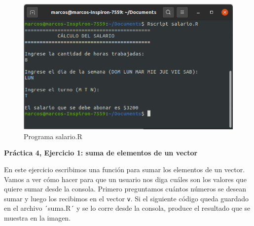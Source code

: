 \documentclass[
]{book}
\newenvironment{Shaded}{\begin{snugshade}}{\end{snugshade}}
\newcommand{\AttributeTok}[1]{\textcolor[rgb]{0.77,0.63,0.00}{#1}}
\newcommand{\ControlFlowTok}[1]{\textcolor[rgb]{0.13,0.29,0.53}{\textbf{#1}}}
\newcommand{\DecValTok}[1]{\textcolor[rgb]{0.00,0.00,0.81}{#1}}
\newcommand{\FunctionTok}[1]{\textcolor[rgb]{0.00,0.00,0.00}{#1}}
\newcommand{\NormalTok}[1]{#1}
\newcommand{\OtherTok}[1]{\textcolor[rgb]{0.56,0.35,0.01}{#1}}
\newcommand{\SpecialCharTok}[1]{\textcolor[rgb]{0.00,0.00,0.00}{#1}}
\newcommand{\StringTok}[1]{\textcolor[rgb]{0.31,0.60,0.02}{#1}}
\begin{document}
\begin{Shaded}
\end{Shaded}

\begin{figure}

{\centering \includegraphics[width=0.8\linewidth]{images/07_otros/consola3} 

}

\caption{Programa salario.R}\label{fig:unnamed-chunk-201}
\end{figure}

\textbf{Práctica 4, Ejercicio 1: suma de elementos de un vector}

En este ejercicio escribimos una función para sumar los elementos de un vector.
Vamos a ver cómo hacer para que un usuario nos diga cuáles son los valores que quiere sumar desde la consola. Primero preguntamos cuántos números se desean sumar y luego los recibimos en el vector \texttt{v}. Si el siguiente código queda guardado en el archivo ´suma.R´ y se lo corre desde la consola, produce el resultado que se muestra en la imagen.
\end{document}
